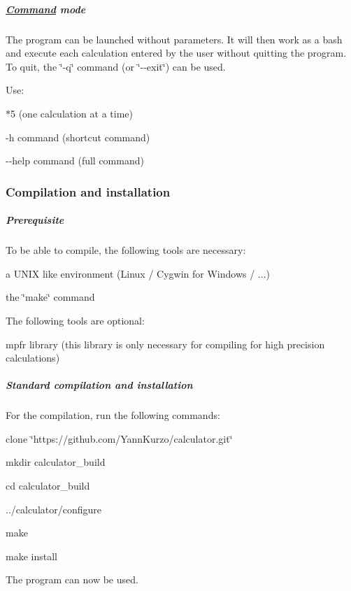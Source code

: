 \subparagraph*{\hyperlink{class_command}{Command} mode}

The program can be launched without parameters. It will then work as a bash and execute each calculation entered by the user without quitting the program. To quit, the \char`\"{}-\/q\char`\"{} command (or \char`\"{}-\/-\/exit\char`\"{}) can be used.
\begin{DoxyItemize}
\item Use\+:
\begin{DoxyItemize}
\item {$\ast$5} (one calculation at a time)
\item {\ttfamily -\/h} command (shortcut command)
\item {\ttfamily -\/-\/help} command (full command)
\end{DoxyItemize}
\end{DoxyItemize}

\subsubsection*{Compilation and installation}

\subparagraph*{Prerequisite}


\begin{DoxyItemize}
\item To be able to compile, the following tools are necessary\+:
\begin{DoxyItemize}
\item a U\+N\+I\+X like environment (Linux / Cygwin for Windows / ...)
\item the \char`\"{}make\char`\"{} command
\end{DoxyItemize}
\item The following tools are optional\+:
\begin{DoxyItemize}
\item mpfr library (this library is only necessary for compiling for high precision calculations)
\end{DoxyItemize}
\end{DoxyItemize}

\subparagraph*{Standard compilation and installation}


\begin{DoxyItemize}
\item For the compilation, run the following commands\+:
\begin{DoxyItemize}
\item {\ttfamily clone \char`\"{}https\+://github.\+com/\+Yann\+Kurzo/calculator.\+git\char`\"{}}
\item {\ttfamily mkdir calculator\+\_\+build}
\item {\ttfamily cd calculator\+\_\+build}
\item {\ttfamily ../calculator/configure}
\item {\ttfamily make}
\item {\ttfamily make install}
\item The program can now be used.
\end{DoxyItemize}
\end{DoxyItemize}

